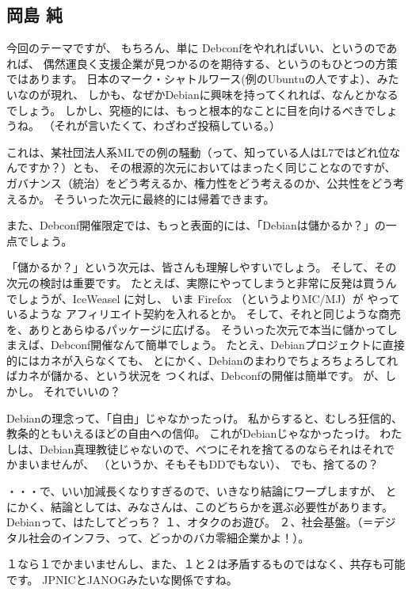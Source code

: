 \documentclass[mingoth,a4paper]{jsarticle}
\begin{document}
\subsection{岡島 純}

今回のテーマですが、
もちろん、単に Debconfをやれればいい、というのであれば、
偶然運良く支援企業が見つかるのを期待する、というのもひとつの方策ではあります。
日本のマーク・シャトルワース(例のUbuntuの人ですよ）、みたいなのが現れ、
しかも、なぜかDebianに興味を持ってくれれば、なんとかなるでしょう。
しかし、究極的には、もっと根本的なことに目を向けるべきでしょうね。
（それが言いたくて、わざわざ投稿している。）

これは、某社団法人系MLでの例の騒動（って、知っている人はL7ではどれ位なんですか？）とも、
その根源的次元においてはまったく同じことなのですが、
ガバナンス（統治）をどう考えるか、権力性をどう考えるのか、公共性をどう考えるか。
そういった次元に最終的には帰着できます。

また、Debconf開催限定では、もっと表面的には、「Debianは儲かるか？」の一点でしょう。

「儲かるか？」という次元は、皆さんも理解しやすいでしょう。
そして、その次元の検討は重要です。
たとえば、実際にやってしまうと非常に反発は買うんでしょうが、IceWeasel に対し、
いま Firefox （というよりMC/MJ）が
やっているような アフィリエイト契約を入れるとか。
そして、それと同じような商売を、ありとあらゆるパッケージに広げる。
そういった次元で本当に儲かってしまえば、Debconf開催なんて簡単でしょう。
たとえ、Debianプロジェクトに直接的にはカネが入らなくても、
とにかく、Debianのまわりでちょろちょろしてればカネが儲かる、という状況を
つくれば、Debconfの開催は簡単です。
が、しかし。
それでいいの？

Debianの理念って、「自由」じゃなかったっけ。
私からすると、むしろ狂信的、教条的ともいえるほどの自由への信仰。
これがDebianじゃなかったっけ。
わたしは、Debian真理教徒じゃないので、べつにそれを捨てるのならそれはそれでかまいませんが、
（というか、そもそもDDでもない）、
でも、捨てるの？

・・・で、いい加減長くなりすぎるので、いきなり結論にワープしますが、
とにかく、結論としては、みなさんは、このどちらかを選ぶ必要性があります。
Debianって、はたしてどっち？
１、オタクのお遊び。
２、社会基盤。（＝デジタル社会のインフラ、って、どっかのバカ零細企業かよ！）。

１なら１でかまいませんし、また、１と２は矛盾するものではなく、共存も可能です。
JPNICとJANOGみたいな関係ですね。
\end{document}
